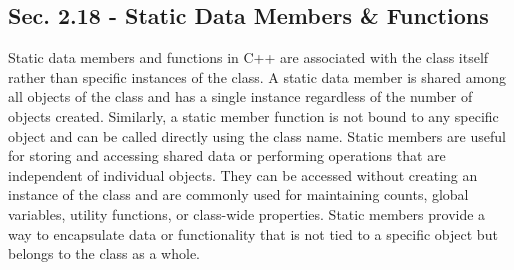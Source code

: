 \subsection*{Sec. 2.18 - Static Data Members \& Functions}

Static data members and functions in C++ are associated with the class itself rather than specific instances of the class. A static data member is shared among all objects of the class and has a single instance regardless of the number of objects created. Similarly, a static member function is not bound to any specific object 
and can be called directly using the class name. Static members are useful for storing and accessing shared data or performing operations that are independent of individual objects. They can be accessed without creating an instance of the class and are commonly used for maintaining counts, global variables, utility functions, 
or class-wide properties. Static members provide a way to encapsulate data or functionality that is not tied to a specific object but belongs to the class as a whole. \\

